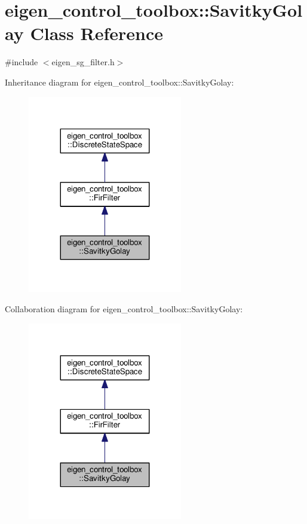\hypertarget{classeigen__control__toolbox_1_1_savitky_golay}{}\section{eigen\+\_\+control\+\_\+toolbox\+:\+:Savitky\+Golay Class Reference}
\label{classeigen__control__toolbox_1_1_savitky_golay}


{\ttfamily \#include $<$eigen\+\_\+sg\+\_\+filter.\+h$>$}



Inheritance diagram for eigen\+\_\+control\+\_\+toolbox\+:\+:Savitky\+Golay\+:
\nopagebreak
\begin{figure}[H]
\begin{center}
\leavevmode
\includegraphics[width=191pt]{classeigen__control__toolbox_1_1_savitky_golay__inherit__graph}
\end{center}
\end{figure}


Collaboration diagram for eigen\+\_\+control\+\_\+toolbox\+:\+:Savitky\+Golay\+:
\nopagebreak
\begin{figure}[H]
\begin{center}
\leavevmode
\includegraphics[width=191pt]{classeigen__control__toolbox_1_1_savitky_golay__coll__graph}
\end{center}
\end{figure}
